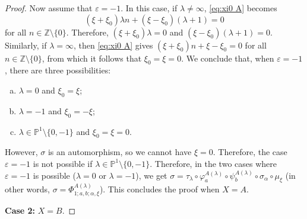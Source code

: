 \documentclass[10pt,a4paper]{amsart}
\newcommand{\PP}{\mathbb{P}}
\newcommand{\ZZ}{\mathbb{Z}}
\newcommand{\case}[2]{\vspace{2mm} \textbf{Case #1:} #2 \vspace{2mm}}
\newcommand{\nonzero}{\setminus \{0\}}
\begin{document}
\begin{proof}
    Now assume that $\varepsilon = -1$. In this case, if $\lambda \neq \infty$, \eqref{eq:xi0 A} becomes
    $$(\xi + \xi_0)\lambda n + (\xi - \xi_0)(\lambda + 1) = 0$$
    for all $n \in \ZZ \nonzero$. Therefore, $(\xi + \xi_0)\lambda = 0$ and $(\xi - \xi_0)(\lambda + 1) = 0$. Similarly, if $\lambda = \infty$, then \eqref{eq:xi0 A} gives $(\xi + \xi_0)n + \xi - \xi_0 = 0$ for all $n \in \ZZ \nonzero$, from which it follows that $\xi_0 = \xi = 0$. We conclude that, when $\varepsilon = -1$, there are three possibilities:
    \begin{enumerate}[(a)]
        \item $\lambda = 0$ and $\xi_0 = \xi$;
        \item $\lambda = -1$ and $\xi_0 = -\xi$;
        \item $\lambda \in \PP^1 \setminus \{0,-1\}$ and $\xi_0 = \xi = 0$.
    \end{enumerate}
    However, $\sigma$ is an automorphism, so we cannot have $\xi = 0$. Therefore, the case $\varepsilon = -1$ is not possible if $\lambda \in \PP^1 \setminus \{0,-1\}$. Therefore, in the two cases where $\varepsilon = -1$ is possible ($\lambda = 0$ or $\lambda = -1$), we get $\sigma = \tau_\lambda \circ \varphi_a^{A(\lambda)} \circ \psi_b^{A(\lambda)} \circ \sigma_\alpha \circ \mu_\xi$ (in other words, $\sigma = \Phi_{1;a,b;\alpha,\xi}^{A(\lambda)}$). This concludes the proof when $X = A$.

    \case{2}{$X = B$.}


\end{proof}
\end{document}
